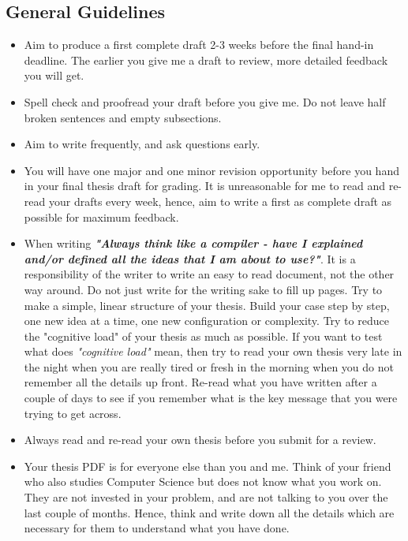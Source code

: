 \documentclass{article}
\begin{document}
\subsection*{General Guidelines}
\begin{itemize}
    \item Aim to produce a first complete draft 2-3 weeks before the final hand-in deadline. The earlier you give me a draft to review, more detailed feedback you will get. 
    \item Spell check and proofread your draft before you give me. Do not leave half broken sentences and empty subsections.
    \item Aim to write frequently, and ask questions early. 
    \item You will have one major and one minor revision opportunity before you hand in your final thesis draft for grading. It is unreasonable for me to read and re-read your drafts every week, hence, aim to write a first as complete draft as possible for maximum feedback. 
    \item When writing \textbf{\textit{"Always think like a compiler - have I explained and/or defined all the ideas that I am about to use?"}}. It is a responsibility of the writer to write an easy to read document, not the other way around. Do not just write for the writing sake to fill up pages. Try to make a simple, linear structure of your thesis. Build your case step by step, one new idea at a time, one new configuration or complexity. Try to reduce the "cognitive load" of your thesis as much as possible. If you want to test what does \textit{"cognitive load"} mean, then try to read your own thesis very late in the night when you are really tired or fresh in the morning when you do not remember all the details up front. Re-read what you have written after a couple of days to see if you remember what is the key message that you were trying to get across. 
    \item Always read and re-read your own thesis before you submit for a review. 
    \item Your thesis PDF is for everyone else than you and me. Think of your friend who also studies Computer Science but does not know what you work on. They are not invested in your problem, and are not talking to you over the last couple of months. Hence, think and write down all the details which are necessary for them to understand what you have done. 
\end{itemize}
\end{document}
